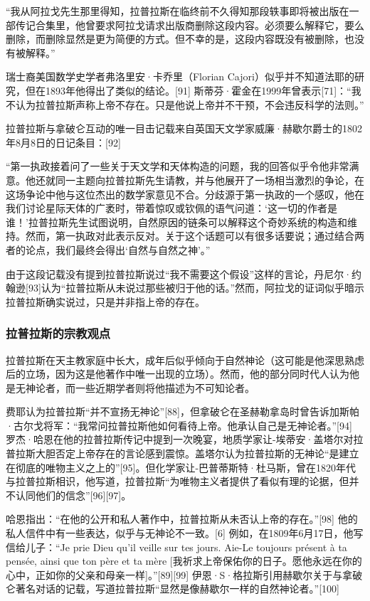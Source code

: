 “我从阿拉戈先生那里得知，拉普拉斯在临终前不久得知那段轶事即将被出版在一部传记合集里，他曾要求阿拉戈请求出版商删除这段内容。必须要么解释它，要么删除，而删除显然是更为简便的方式。但不幸的是，这段内容既没有被删除，也没有被解释。”

瑞士裔美国数学史学者弗洛里安·卡乔里（Florian Cajori）似乎并不知道法耶的研究，但在1893年他得出了类似的结论。[91] 斯蒂芬·霍金在1999年曾表示[71]：“我不认为拉普拉斯声称上帝不存在。只是他说上帝并不干预，不会违反科学的法则。”

拉普拉斯与拿破仑互动的唯一目击记载来自英国天文学家威廉·赫歇尔爵士的1802年8月8日的日记条目：[92]

“第一执政接着问了一些关于天文学和天体构造的问题，我的回答似乎令他非常满意。他还就同一主题向拉普拉斯先生请教，并与他展开了一场相当激烈的争论，在这场争论中他与这位杰出的数学家意见不合。分歧源于第一执政的一个感叹，他在我们讨论星际天体的广袤时，带着惊叹或钦佩的语气问道：‘这一切的作者是谁！’拉普拉斯先生试图说明，自然原因的链条可以解释这个奇妙系统的构造和维持。然而，第一执政对此表示反对。关于这个话题可以有很多话要说；通过结合两者的论点，我们最终会得出‘自然与自然之神’。”

由于这段记载没有提到拉普拉斯说过“我不需要这个假设”这样的言论，丹尼尔·约翰逊[93]认为“拉普拉斯从未说过那些被归于他的话。”然而，阿拉戈的证词似乎暗示拉普拉斯确实说过，只是并非指上帝的存在。
\subsubsection{拉普拉斯的宗教观点}
拉普拉斯在天主教家庭中长大，成年后似乎倾向于自然神论（这可能是他深思熟虑后的立场，因为这是他著作中唯一出现的立场）。然而，他的部分同时代人认为他是无神论者，而一些近期学者则将他描述为不可知论者。

费耶认为拉普拉斯“并不宣扬无神论”[88]，但拿破仑在圣赫勒拿岛时曾告诉加斯帕·古尔戈将军：“我常问拉普拉斯他如何看待上帝。他承认自己是无神论者。”[94] 罗杰·哈恩在他的拉普拉斯传记中提到一次晚宴，地质学家让-埃蒂安·盖塔尔对拉普拉斯大胆否定上帝存在的言论感到震惊。盖塔尔认为拉普拉斯的无神论“是建立在彻底的唯物主义之上的”[95]。但化学家让-巴普蒂斯特·杜马斯，曾在1820年代与拉普拉斯相识，他写道，拉普拉斯“为唯物主义者提供了看似有理的论据，但并不认同他们的信念”[96][97]。

哈恩指出：“在他的公开和私人著作中，拉普拉斯从未否认上帝的存在。”[98] 他的私人信件中有一些表达，似乎与无神论不一致。[6] 例如，在1809年6月17日，他写信给儿子：“Je prie Dieu qu'il veille sur tes jours. Aie-Le toujours présent à ta pensée, ainsi que ton père et ta mère [我祈求上帝保佑你的日子。愿他永远在你的心中，正如你的父亲和母亲一样]。”[89][99] 伊恩·S·格拉斯引用赫歇尔关于与拿破仑著名对话的记载，写道拉普拉斯“显然是像赫歇尔一样的自然神论者。”[100]

